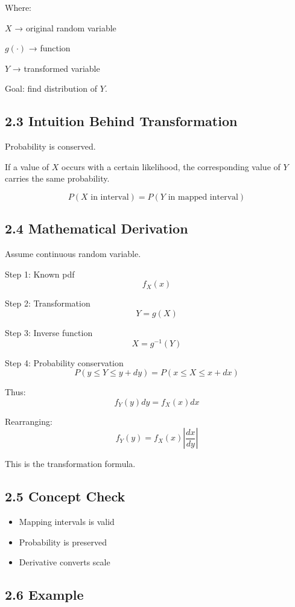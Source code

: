 \documentclass[12pt,a4paper]{article}
\begin{document}
Where:

$X$ → original random variable  

$g(\cdot)$ → function  

$Y$ → transformed variable  

Goal: find distribution of $Y$.

\subsection*{2.3 Intuition Behind Transformation}

Probability is conserved.

If a value of $X$ occurs with a certain likelihood, the corresponding value of $Y$ carries the same probability.

\[
P(X \text{ in interval}) = P(Y \text{ in mapped interval})
\]

\subsection*{2.4 Mathematical Derivation}

Assume continuous random variable.

Step 1: Known pdf
\[
f_X(x)
\]

Step 2: Transformation
\[
Y = g(X)
\]

Step 3: Inverse function
\[
X = g^{-1}(Y)
\]

Step 4: Probability conservation
\[
P(y \le Y \le y + dy) = P(x \le X \le x + dx)
\]

Thus:
\[
f_Y(y) dy = f_X(x) dx
\]

Rearranging:
\[
f_Y(y) = f_X(x)\left|\frac{dx}{dy}\right|
\]

This is the transformation formula.

\subsection*{2.5 Concept Check}

\begin{itemize}
\item Mapping intervals is valid
\item Probability is preserved
\item Derivative converts scale
\end{itemize}

\subsection*{2.6 Example}
\end{document}
